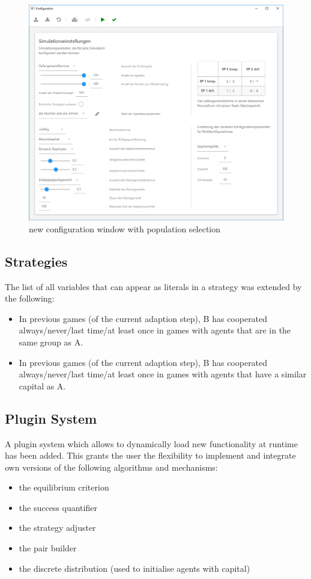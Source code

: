 \documentclass[parskip=full,11pt]{scrartcl}
\begin{document}
\begin{figure}[h]
	\centering
	\includegraphics[width = \linewidth]{images/new_config.png}
	\caption{new configuration window with population selection}
	\label{fig:new_config}
\end{figure}

\subsection{Strategies}
The list of all variables that can appear as literals in a strategy was extended by the following:
\begin{itemize}
\item In previous games (of the current adaption step), B has cooperated always/never/last time/at least once in games with agents that are in the same group as A.
\item In previous games (of the current adaption step), B has cooperated always/never/last time/at least once in games with agents that have a similar capital as A.
\end{itemize}

\subsection{Plugin System}

A plugin system which allows to dynamically load new functionality at runtime has been added. This grants the user the flexibility to implement and integrate own versions of the following algorithms and mechanisms:
\begin{itemize} \itemsep -10pt
	\item the equilibrium criterion
	\item the success quantifier
	\item the strategy adjuster
	\item the pair builder
	\item the discrete distribution (used to initialise agents with capital)
\end{itemize}
\end{document}
